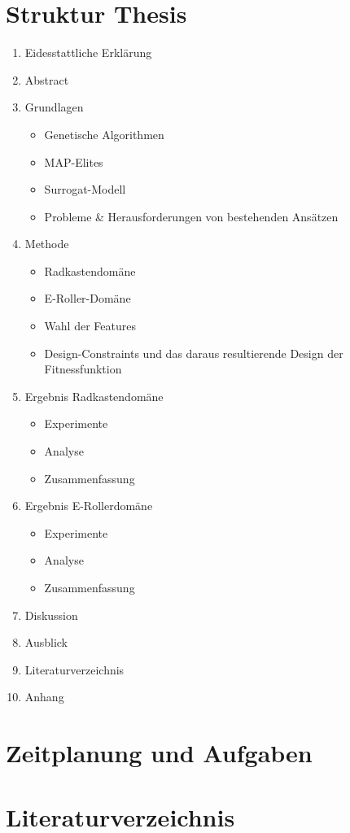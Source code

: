 \documentclass[12pt]{article}
\begin{document}
\begin{appendix}
\section{Struktur Thesis}

\begin{enumerate}
	\item Eidesstattliche Erklärung
	\item Abstract
	\item Grundlagen
	\begin{itemize}
		\item Genetische Algorithmen
		\item MAP-Elites
		\item Surrogat-Modell
		\item Probleme \& Herausforderungen von bestehenden Ansätzen 
	\end{itemize}
\item Methode
\begin{itemize}
	\item Radkastendomäne
	\item E-Roller-Domäne
	\item Wahl der Features
	\item Design-Constraints und das daraus resultierende Design der Fitnessfunktion
\end{itemize}
\item Ergebnis Radkastendomäne
\begin{itemize}
	\item Experimente
	\item Analyse
	\item Zusammenfassung
\end{itemize}
\item Ergebnis E-Rollerdomäne
\begin{itemize}
	\item Experimente
	\item Analyse
	\item Zusammenfassung
\end{itemize}
\item Diskussion
\item Ausblick
\item Literaturverzeichnis
\item Anhang
\end{enumerate}

\section{Zeitplanung und Aufgaben}

\end{appendix}
  
\newpage{}
\section{Literaturverzeichnis}

\newpage{}
\end{document}
